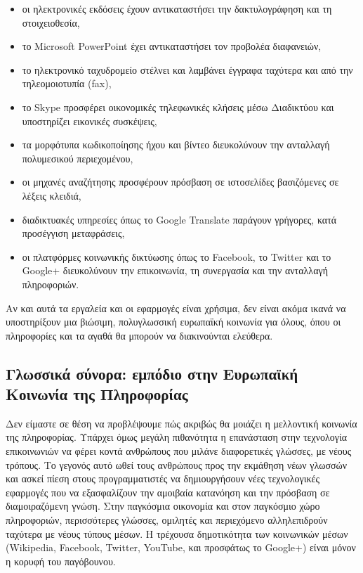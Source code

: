 \begin{multicols}{2}
\begin{itemize}
\item οι ηλεκτρονικές εκδόσεις έχουν αντικαταστήσει την δακτυλογράφηση και τη στοιχειοθεσία,
\item το Microsoft PowerPoint έχει αντικαταστήσει τον προβολέα διαφανειών,
\item το ηλεκτρονικό ταχυδρομείο στέλνει και λαμβάνει έγγραφα ταχύτερα και από την τηλεομοιοτυπία (fax),
\item το Skype προσφέρει οικονομικές τηλεφωνικές κλήσεις μέσω Διαδικτύου και υποστηρίζει εικονικές συσκέψεις,
\item τα μορφότυπα κωδικοποίησης ήχου και βίντεο διευκολύνουν την ανταλλαγή πολυμεσικού περιεχομένου,
\item οι μηχανές αναζήτησης προσφέρουν πρόσβαση σε ιστοσελίδες βασιζόμενες σε λέξεις κλειδιά,
\item διαδικτυακές υπηρεσίες όπως το Google Translate παράγουν γρήγορες, κατά προσέγγιση μεταφράσεις,
\item οι πλατφόρμες κοινωνικής δικτύωσης όπως το Facebook, το Twitter και το Google+ διευκολύνουν την επικοινωνία, τη συνεργασία και την ανταλλαγή πληροφοριών.
\end{itemize}

Αν και αυτά τα εργαλεία και οι εφαρμογές είναι χρήσιμα, δεν είναι ακόμα ικανά να υποστηρίξουν μια βιώσιμη, πολυγλωσσική ευρωπαϊκή κοινωνία για όλους, όπου οι πληροφορίες και τα αγαθά θα μπορούν να διακινούνται ελεύθερα.

\subsection{Γλωσσικά σύνορα: εμπόδιο στην Ευρωπαϊκή Κοινωνία της Πληροφορίας}
  
Δεν είμαστε σε θέση να προβλέψουμε πώς ακριβώς θα μοιάζει η μελλοντική κοινωνία της πληροφορίας. Υπάρχει όμως μεγάλη πιθανότητα η επανάσταση στην τεχνολογία επικοινωνιών να φέρει κοντά ανθρώπους που μιλάνε διαφορετικές γλώσσες, με νέους τρόπους. Το γεγονός αυτό ωθεί τους ανθρώπους προς την εκμάθηση νέων γλωσσών και ασκεί πίεση στους προγραμματιστές να δημιουργήσουν νέες τεχνολογικές εφαρμογές που να εξασφαλίζουν την αμοιβαία κατανόηση και την πρόσβαση σε διαμοιραζόμενη γνώση. Στην παγκόσμια οικονομία και στον παγκόσμιο χώρο πληροφοριών, περισσότερες γλώσσες, ομιλητές και περιεχόμενο αλληλεπιδρούν ταχύτερα με νέους τύπους μέσων. Η τρέχουσα δημοτικότητα των κοινωνικών μέσων (Wikipedia, Facebook, Twitter, YouTube, και προσφάτως το Google+) είναι μόνον η κορυφή του παγόβουνου.


\end{multicols}
